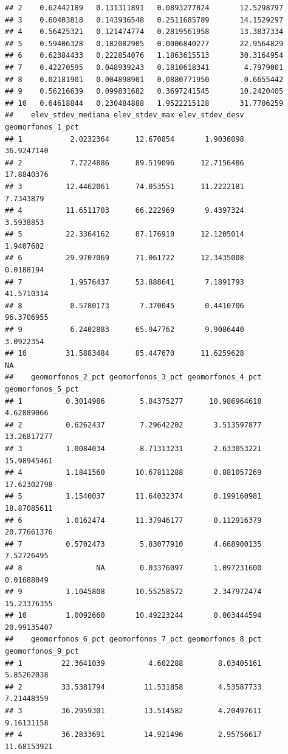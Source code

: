 \documentclass[11pt,]{article}
\begin{document}
\begin{verbatim}
## 2    0.62442189   0.131311891   0.0893277824       12.5298797
## 3    0.60403818   0.143936548   0.2511685789       14.1529297
## 4    0.56425321   0.121474774   0.2819561958       13.3837334
## 5    0.59406328   0.182082905   0.0006840277       22.9564829
## 6    0.62384433   0.222854076   1.1863615513       30.3164954
## 7    0.42270595   0.048939243   0.1810618341        4.7979001
## 8    0.02181901   0.004898901   0.0880771950        0.6655442
## 9    0.56216639   0.099831682   0.3697241545       10.2420405
## 10   0.64618844   0.230484888   1.9522215128       31.7706259
##    elev_stdev_mediana elev_stdev_max elev_stdev_desv geomorfonos_1_pct
## 1           2.0232364      12.670854       1.9036098        36.9247140
## 2           7.7224886      89.519096      12.7156486        17.8840376
## 3          12.4462061      74.053551      11.2222181         7.7343879
## 4          11.6511703      66.222969       9.4397324         3.5938853
## 5          22.3364162      87.176910      12.1205014         1.9407602
## 6          29.9707069      71.061722      12.3435008         0.0188194
## 7           1.9576437      53.888641       7.1891793        41.5710314
## 8           0.5780173       7.370045       0.4410706        96.3706955
## 9           6.2402883      65.947762       9.9086440         3.0922354
## 10         31.5883484      85.447670      11.6259628                NA
##    geomorfonos_2_pct geomorfonos_3_pct geomorfonos_4_pct geomorfonos_5_pct
## 1          0.3014986        5.84375277      10.986964618        4.62889066
## 2          0.6262437        7.29642202       3.513597877       13.26817277
## 3          1.0084034        8.71313231       2.633053221       15.98945461
## 4          1.1841560       10.67811288       0.881057269       17.62302798
## 5          1.1540037       11.64032374       0.199160981       18.87085611
## 6          1.0162474       11.37946177       0.112916379       20.77661376
## 7          0.5702473        5.83077910       4.668900135        7.52726495
## 8                 NA        0.03376097       1.097231600        0.01688049
## 9          1.1045808       10.55258572       2.347972474       15.23376355
## 10         1.0092660       10.49223244       0.003444594       20.99135407
##    geomorfonos_6_pct geomorfonos_7_pct geomorfonos_8_pct geomorfonos_9_pct
## 1         22.3641039          4.602288        8.03405161        5.85262038
## 2         33.5381794         11.531858        4.53587733        7.21448359
## 3         36.2959301         13.514582        4.20497611        9.16131158
## 4         36.2833691         14.921496        2.95756617       11.68153921

\end{verbatim}
\end{document}

